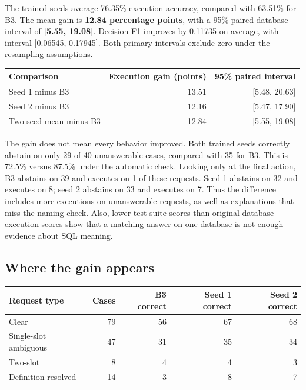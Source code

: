 \documentclass[11pt,a4paper]{article}
\begin{document}
The trained seeds average 76.35\% execution accuracy, compared with 63.51\% for B3. The mean gain is
\textbf{12.84 percentage points}, with a 95\% paired database interval of \textbf{[5.55, 19.08]}.
Decision F1 improves by 0.11735 on average, with interval [0.06545, 0.17945]. Both primary intervals
exclude zero under the resampling assumptions.

\begin{center}
\small
\begin{tabular}{lrr}
\toprule
Comparison & Execution gain (points) & 95\% paired interval \\
\midrule
Seed 1 minus B3 & 13.51 & [5.48, 20.63] \\
Seed 2 minus B3 & 12.16 & [5.47, 17.90] \\
Two-seed mean minus B3 & 12.84 & [5.55, 19.08] \\
\bottomrule
\end{tabular}
\end{center}

The gain does not mean every behavior improved. Both trained seeds correctly abstain on only 29 of
40 unanswerable cases, compared with 35 for B3. This is 72.5\% versus 87.5\% under the automatic check.
Looking only at the final action, B3 abstains on 39 and executes on 1 of these requests. Seed 1 abstains
on 32 and executes on 8; seed 2 abstains on 33 and executes on 7. Thus the difference includes more
executions on unanswerable requests, as well as explanations that miss the naming check.
Also, lower test-suite scores than original-database execution scores show that a matching answer on
one database is not enough evidence about SQL meaning.

\subsection{Where the gain appears}
\begin{center}
\begin{tabular}{lrrrr}
\toprule
Request type & Cases & B3 correct & Seed 1 correct & Seed 2 correct \\
\midrule
Clear & 79 & 56 & 67 & 68 \\
Single-slot ambiguous & 47 & 31 & 35 & 34 \\
Two-slot & 8 & 4 & 4 & 3 \\
Definition-resolved & 14 & 3 & 8 & 7 \\
\bottomrule
\end{tabular}
\end{center}
\end{document}
